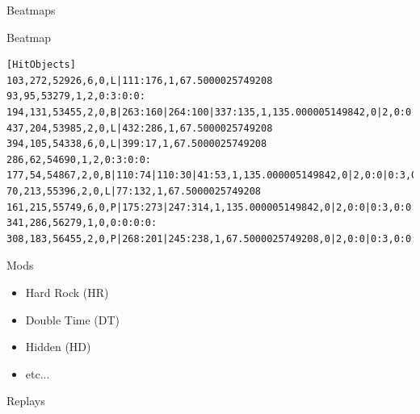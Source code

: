 \documentclass[table]{beamer}
\begin{document}
\begin{frame}[fragile]{Beatmaps}
  \begin{block}{Beatmap}
    \begin{verbatim}
[HitObjects]
103,272,52926,6,0,L|111:176,1,67.5000025749208
93,95,53279,1,2,0:3:0:0:
194,131,53455,2,0,B|263:160|264:100|337:135,1,135.000005149842,0|2,0:0|0:3,0:0:0:0:
437,204,53985,2,0,L|432:286,1,67.5000025749208
394,105,54338,6,0,L|399:17,1,67.5000025749208
286,62,54690,1,2,0:3:0:0:
177,54,54867,2,0,B|110:74|110:30|41:53,1,135.000005149842,0|2,0:0|0:3,0:0:0:0:
70,213,55396,2,0,L|77:132,1,67.5000025749208
161,215,55749,6,0,P|175:273|247:314,1,135.000005149842,0|2,0:0|0:3,0:0:0:0:
341,286,56279,1,0,0:0:0:0:
308,183,56455,2,0,P|268:201|245:238,1,67.5000025749208,0|2,0:0|0:3,0:0:0:0:
    \end{verbatim}
  \end{block}
\end{frame}

\begin{frame}{Mods}
  \begin{itemize}
  \item<1-> Hard Rock (HR)
  \item<2-> Double Time (DT)
  \item<3-> Hidden (HD)
  \item<4-> etc...
  \end{itemize}
\end{frame}

\begin{frame}{Replays}

\end{frame}
\end{document}
